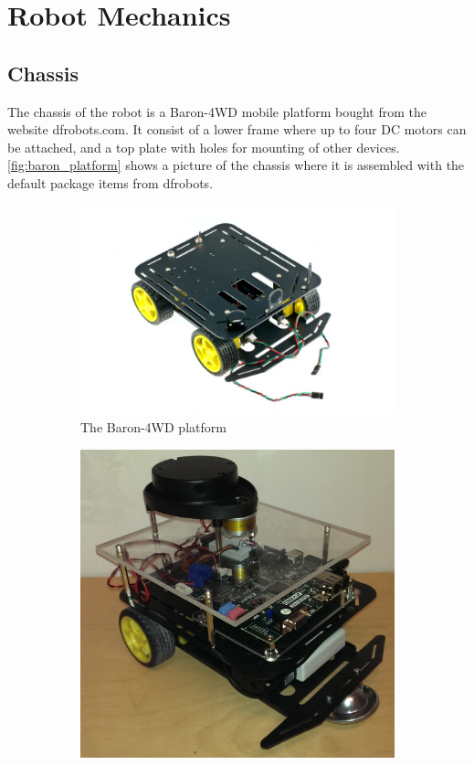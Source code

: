 \documentclass[Main]{subfiles}
\begin{document}
\section{Robot Mechanics} %
	\label{sec:robot_mechanics}

	\subsection{Chassis} %
		\label{sub:chassis}
The chassis of the robot is a Baron-4WD mobile platform bought from the website dfrobots.com. 
It consist of a lower frame where up to four DC motors can be attached, and a top plate with holes for mounting of other devices. 
\autoref{fig:baron_platform} shows a picture of the chassis where it is assembled with the default package items from dfrobots.
\begin{figure}[H]
	\centering
	\begin{subfigure}[b]{0.55\linewidth}
		\includegraphics[width=1\linewidth]{./Figures/baron_platform.jpg}
		\caption{The Baron-4WD platform}
		\label{fig:baron_platform}
	\end{subfigure}	
	\begin{subfigure}[b]{0.4\linewidth}
		\includegraphics[width=1\linewidth]{./Figures/final_robot.png}

\end{subfigure}
\end{figure}
\end{document}
